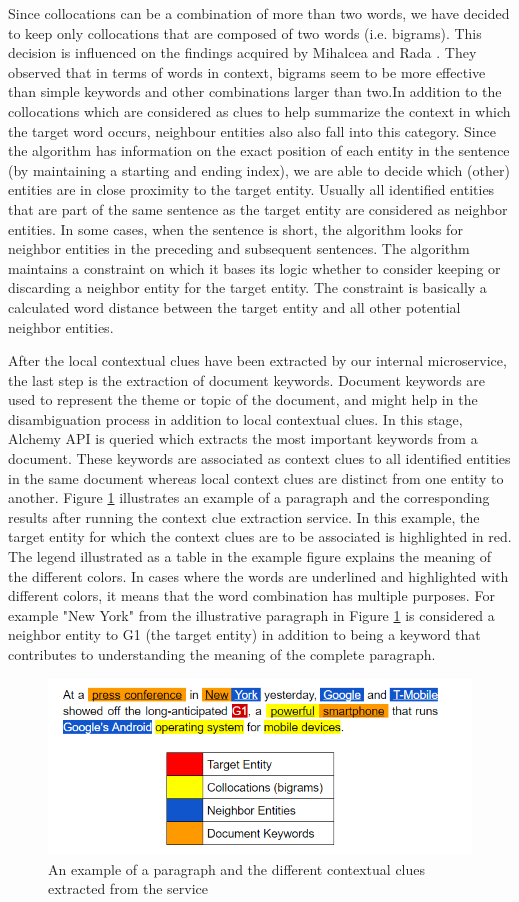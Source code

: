 Since collocations can be a combination of more than two words, we have decided to keep only collocations that are composed of two words (i.e. bigrams). This decision is influenced on the findings acquired by Mihalcea and Rada \cite{36}. They observed that in terms of words in context, bigrams seem to be more effective than simple keywords and other combinations larger than two.In addition to the collocations which are considered as clues to help summarize the context in which the target word occurs, neighbour entities also also fall into this category. Since the algorithm has information on the exact position of each entity in the sentence (by maintaining a starting and ending index), we are able to decide which (other) entities are in close proximity to the target entity. Usually all identified entities that are part of the same sentence as the target entity are considered as neighbor entities. In some cases, when the sentence is short, the algorithm looks for neighbor entities in the preceding and subsequent sentences. The algorithm maintains a constraint on which it bases its logic whether to consider keeping or discarding a neighbor entity for the target entity. The constraint is basically a calculated word distance between the target entity and all other potential neighbor entities. 

After the local contextual clues have been extracted by our internal microservice, the last step is the extraction of document keywords. Document keywords are used to represent the theme or topic of the document, and might help in the disambiguation process in addition to local contextual clues. In this stage, Alchemy API is queried which extracts the most important keywords from a document. These keywords are associated as context clues to all identified entities in the same document whereas local context clues are distinct from one entity to another. Figure \ref{fig:context-clue} illustrates an example of a paragraph and the corresponding results after running the context clue extraction service. In this example, the target entity for which the context clues are to be associated is highlighted in red. The legend illustrated as a table in the example figure explains the meaning of the different colors. In cases where the words are underlined and highlighted with different colors, it means that the word combination has multiple purposes. For example "New York" from the illustrative paragraph in Figure \ref{fig:context-clue} is considered a neighbor entity to G1 (the target entity) in addition to being a keyword that contributes to understanding the meaning of the complete paragraph.


\begin{figure}[]
  \includegraphics[width=\linewidth]{figures/context-clues.png}
  \caption{An example of a paragraph and the different contextual clues extracted from the service}
  \label{fig:context-clue}
\end{figure}